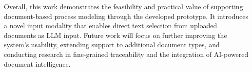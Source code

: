 Overall, this work demonstrates the feasibility and practical value of supporting document-based process modeling through the developed prototype. It introduces a novel input modality that enables direct text selection from uploaded documents as LLM input. Future work will focus on further improving the system’s usability, extending support to additional document types, and conducting research in fine-grained traceability and the integration of AI-powered document intelligence.